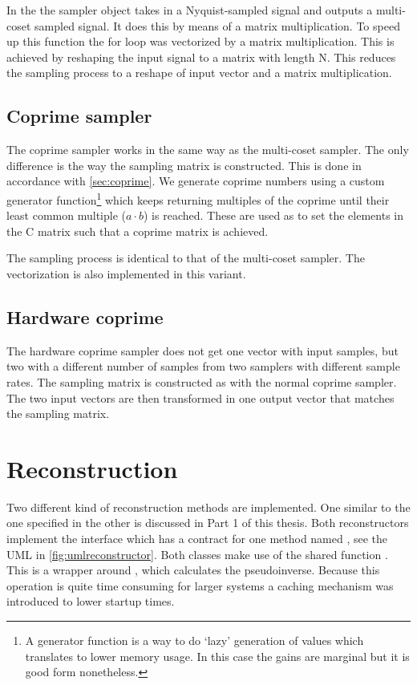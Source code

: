 \documentclass[a4paper, openany, oneside]{memoir}
\begin{document}
In the  the sampler object takes in a Nyquist-sampled signal and outputs a multi-coset sampled signal. It does this by means of a matrix multiplication. To speed up this function the for loop was vectorized by a matrix multiplication. This is achieved by reshaping the input signal to a matrix with length N. This reduces the sampling process to a reshape of input vector and a matrix multiplication.


\subsection{Coprime sampler}
\label{sec:coprime-sampler}
The coprime sampler works in the same way as the multi-coset sampler. The only difference is the way the sampling matrix is constructed. This is done in accordance with \cref{sec:coprime}. We generate coprime numbers using a custom generator function\footnote{
    A generator function is a way to do `lazy' generation of values which translates to lower memory usage. In this case the gains are marginal but it is good form nonetheless.}
which keeps returning multiples of the coprime until their least common multiple ($a \cdot b$) is reached. These are used as to set the elements in the C matrix such that a coprime matrix is achieved.

The sampling process is identical to that of the multi-coset sampler. The vectorization is also implemented in this variant.

\subsection{Hardware coprime}
\label{sec:hardware-coprime}
The hardware coprime sampler does not get one vector with input samples, but two with a different number of samples from two samplers with different sample rates. The sampling matrix is constructed as with the normal coprime sampler. The two input vectors are then transformed in one output vector that matches the sampling matrix.

\section{Reconstruction}
\label{sec:reconstruction}
Two different kind of reconstruction methods are implemented. One similar to the one specified in \cite{ariananda2012compressive} the other is discussed in Part 1 of this thesis. Both reconstructors implement the interface  which has a contract for one method named , see the UML in \cref{fig:umlreconstructor}. Both classes make use of the shared function . This is a wrapper around  , which calculates the pseudoinverse. Because this operation is quite time consuming for larger systems a caching mechanism was introduced to lower startup times.
\end{document}
